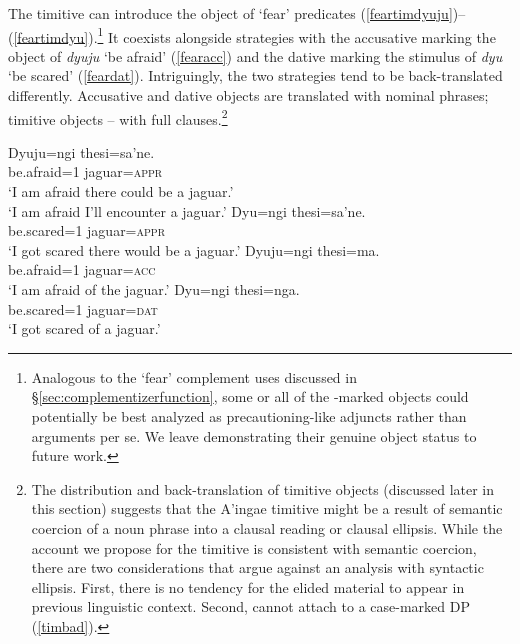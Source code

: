 \documentclass[output=paper,colorlinks,citecolor=brown]{langscibook}
\begin{document}
{The timitive  can introduce the object of `fear' predicates (\ref{feartimdyuju})--(\ref{feartimdyu}).\footnote{Analogous to the `fear' complement uses discussed in \S\ref{sec:complementizerfunction}, some or all of the \sane{}-marked objects could potentially be best analyzed as precautioning-like adjuncts rather than arguments per se. We leave demonstrating their genuine object status to future work.} It coexists alongside strategies with the accusative  marking the object of \textit{dyuju} `be afraid' (\ref{fearacc}) and the dative  marking the stimulus of \textit{dyu} `be scared' (\ref{feardat}). Intriguingly, the two strategies tend to be back-translated differently. Accusative and dative objects are translated with nominal phrases; timitive objects -- with full clauses.}\footnote{The distribution and back-translation of timitive objects (discussed later in this section) suggests that the A'ingae timitive might be a result of semantic coercion of a noun phrase into a clausal reading or clausal ellipsis. While the account we propose for the timitive is consistent with semantic coercion, there are two considerations that argue against an analysis with syntactic ellipsis. First, there is no tendency for the elided material to appear in previous linguistic context. Second, \sane[] cannot attach to a case-marked DP (\ref{timbad}).


\z
}
    \begin{exe} \ex \label{feartimdyuju}
      \gll Dyuju=ngi        {\ob}thesi=sa'ne.{\cb} \\
         {be.afraid=\textsc{1}} jaguar=\textsc{appr} \\
    \glt `I am afraid there could be a jaguar.' \\
        `I am afraid I'll encounter a jaguar.'
    \ex \label{feartimdyu}
        \gll Dyu=ngi {\ob}thesi=sa'ne.{\cb} \\
         {be.scared=\textsc{1}} jaguar=\textsc{appr} \\
    \glt `I got scared there would be a jaguar.'
    \ex \label{fearacc}
    \gll Dyuju=ngi thesi=ma. \\
        {be.afraid=\textsc{1}} jaguar=\textsc{acc} \\
    \glt `I am afraid of the jaguar.'
    \ex \label{feardat}
    \gll Dyu=ngi thesi=nga. \\
         {be.scared=\textsc{1}} jaguar=\textsc{dat} \\
    \glt `I got scared of a jaguar.'
\end{exe}
\end{document}
